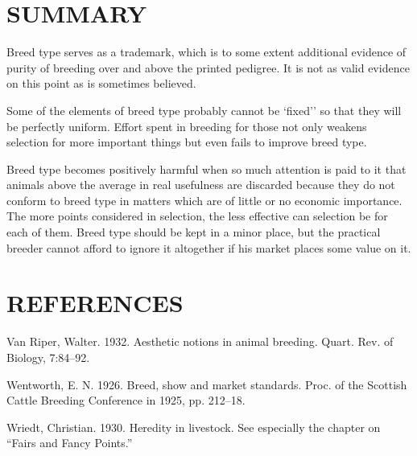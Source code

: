 \section*{SUMMARY}

Breed type serves as a trademark, which is to some extent additional
evidence of purity of breeding over and above the printed pedigree. It
is not as valid evidence on this point as is sometimes believed.

Some of the elements of breed type probably cannot be `fixed'' so
that they will be perfectly uniform. Effort spent in breeding for those
not only weakens selection for more important things but even fails to
improve breed type.

Breed type becomes positively harmful when so much attention is
paid to it that animals above the average in real usefulness are
discarded because they do not conform to breed type in matters which are
of little or no economic importance. The more points considered in
selection, the less effective can selection be for each of them. Breed type
should be kept in a minor place, but the practical breeder cannot afford
to ignore it altogether if his market places some value on it.

\section*{REFERENCES}

\begin{hangparas}{0.5in}{1}%
Van Riper, Walter. 1932. Aesthetic notions in animal breeding. Quart. Rev. of
Biology, 7:84--92.

Wentworth, E. N. 1926. Breed, show and market standards. Proc. of the Scottish
Cattle Breeding Conference in 1925, pp. 212--18.

Wriedt, Christian. 1930. Heredity in livestock. See especially the chapter on
``Fairs and Fancy Points.''
\end{hangparas}